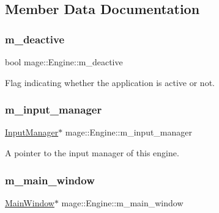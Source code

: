 \subsection{Member Data Documentation}
\hypertarget{classmage_1_1_engine_ab8a4b0157403708ae7d1d018a95b4c63}{}\label{classmage_1_1_engine_ab8a4b0157403708ae7d1d018a95b4c63} 
\subsubsection{\texorpdfstring{m\+\_\+deactive}{m\_deactive}}
{\footnotesize\ttfamily bool mage\+::\+Engine\+::m\+\_\+deactive\hspace{0.3cm}{\ttfamily [protected]}}

Flag indicating whether the application is active or not. \hypertarget{classmage_1_1_engine_a17aec067a1337c567c5cb1959c668da6}{}\label{classmage_1_1_engine_a17aec067a1337c567c5cb1959c668da6} 
\subsubsection{\texorpdfstring{m\+\_\+input\+\_\+manager}{m\_input\_manager}}
{\footnotesize\ttfamily \hyperlink{classmage_1_1_input_manager}{Input\+Manager}$\ast$ mage\+::\+Engine\+::m\+\_\+input\+\_\+manager\hspace{0.3cm}{\ttfamily [protected]}}

A pointer to the input manager of this engine. \hypertarget{classmage_1_1_engine_abe33f2ef533f142a0e9ba8d3a2a51d6b}{}\label{classmage_1_1_engine_abe33f2ef533f142a0e9ba8d3a2a51d6b} 
\subsubsection{\texorpdfstring{m\+\_\+main\+\_\+window}{m\_main\_window}}
{\footnotesize\ttfamily \hyperlink{classmage_1_1_main_window}{Main\+Window}$\ast$ mage\+::\+Engine\+::m\+\_\+main\+\_\+window\hspace{0.3cm}{\ttfamily [protected]}}

